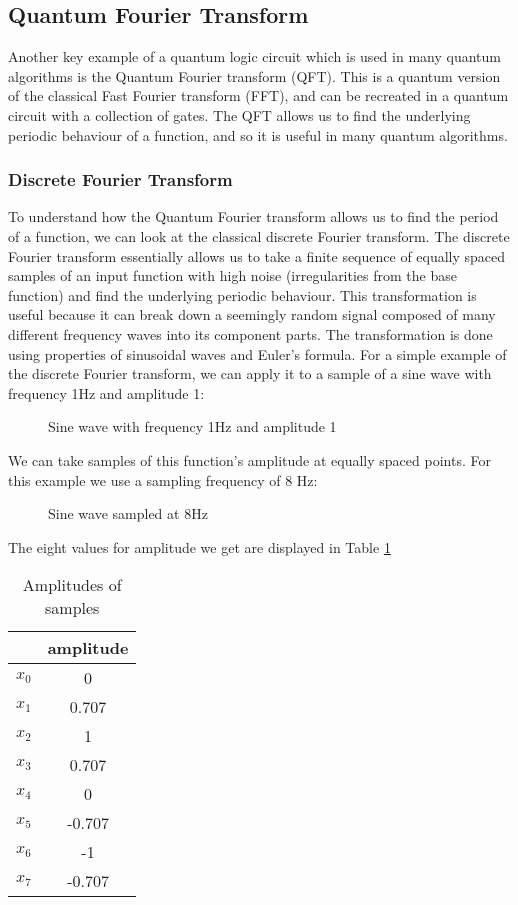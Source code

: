 \subsection{Quantum Fourier Transform}
Another key example of a quantum logic circuit which is used in many quantum algorithms is the Quantum Fourier transform (QFT). This is a quantum version of the classical Fast Fourier transform (FFT), and can be recreated in a quantum circuit with a collection of gates. The QFT allows us to find the underlying periodic behaviour of a function, and so it is useful in many quantum algorithms.
\subsubsection{Discrete Fourier Transform} 
To understand how the Quantum Fourier transform allows us to find the period of a function, we can look at the classical discrete Fourier transform. The discrete Fourier transform essentially allows us to take a finite sequence of equally spaced samples of an input function with high noise (irregularities from the base function) and find the underlying periodic behaviour. This transformation is useful because it can break down a seemingly random signal composed of many different frequency waves into its component parts. The transformation is done using properties of sinusoidal waves and Euler's formula.
For a simple example of the discrete Fourier transform, we can apply it to a sample of a sine wave with frequency 1Hz and amplitude 1:
\begin{figure}[!htb]
\centering
\resizebox{7cm}{!}{}
\caption{Sine wave with frequency 1Hz and amplitude 1}
\label{fig:sine}
\end{figure}
We can take samples of this function's amplitude at equally spaced points. For this example we use a sampling frequency of 8 Hz:
\begin{figure}[!htb]
\centering
\resizebox{7cm}{!}{}
\caption{Sine wave sampled at 8Hz}
\label{fig:sineSample}
\end{figure}
The eight values for amplitude we get are displayed in Table \ref{table:amplitudes}
\begin{table}[!htb]
\centering
\begin{tabular}{ |c|c| } 
\hline
 & amplitude \\
\hline
$x_0$ & 0 \\ 
$x_1$ & 0.707 \\ 
$x_2$ & 1 \\ 
$x_3$ & 0.707 \\ 
$x_4$ & 0 \\ 
$x_5$ & -0.707 \\ 
$x_6$ & -1 \\ 
$x_7$ & -0.707 \\ 
\hline
\end{tabular}
\caption{Amplitudes of samples}
\label{table:amplitudes}
\end{table}
